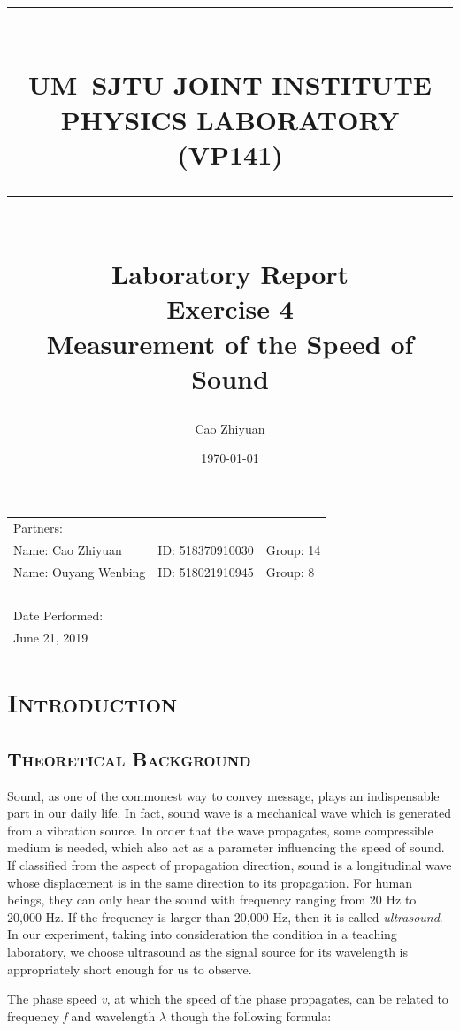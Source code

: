 \documentclass[a4paper,12pt]{article}
\title{ \rule{\textwidth}{0.3mm} \\UM–SJTU JOINT INSTITUTE \\ PHYSICS LABORATORY \\ (VP141) \\ \rule{\textwidth}{0.3mm} \\ [30 mm]  \Large{Laboratory Report} \\[5 mm]  Exercise 4 \\[1 mm] Measurement of the Speed of Sound\\[15 mm]} %
\author{Cao Zhiyuan} %
\date{\today} %
\begin{document}
\scshape

\maketitle %

\begin{center}
\begin{tabular}{l l l}
\\[6 mm]
Partners:  \\
Name: Cao Zhiyuan & ID: 518370910030 & Group: 14 \\
Name: Ouyang Wenbing & ID: 518021910945 & Group: 8 \\
~\\
Date Performed:\\
June 21, 2019\\
\end{tabular}
\end{center}

\thispagestyle{empty}


\newpage


\small\tableofcontents
\thispagestyle{empty}


\newpage


\setcounter{page}{1}
\upshape
\section{\textsc{Introduction}}
\subsection{\textsc{Theoretical Background}}
Sound, as one of the commonest way to convey message, plays an indispensable part in our daily life. In fact, sound wave is a mechanical wave which is generated from a vibration source. In order that the wave propagates, some compressible medium is needed, which also act as a parameter influencing the speed of sound. If classified from the aspect of propagation direction, sound is a longitudinal wave whose displacement is in the same direction to its propagation. For human beings, they can only hear the sound with frequency ranging from 20 Hz to 20,000 Hz. If the frequency is larger than 20,000 Hz, then it is called \textsl{ultrasound}. In our experiment, taking into consideration the condition in a teaching laboratory, we choose ultrasound as the signal source for its wavelength is appropriately short enough for us to observe.\par
The phase speed \textit{v}, at which the speed of the phase propagates, can be related to frequency \textit{f} and wavelength \textit{$\lambda$} though the following formula:
\end{document}
